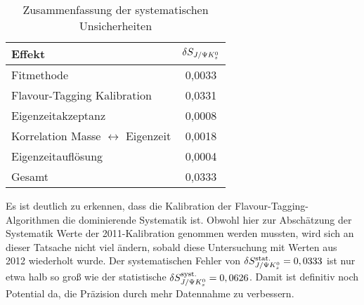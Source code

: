 \begin{table}[hptb]
\centering
\caption{Zusammenfassung der systematischen Unsicherheiten}
\label{tab:syst_gesamt}
\begin{tabular}{l c }
\hline \hline
Effekt & $\delta S_{J/\Psi K_s^0}$ \\ \hline
Fitmethode & 0,0033 \\
Flavour-Tagging Kalibration & 0,0331 \\
Eigenzeitakzeptanz & 0,0008 \\
Korrelation Masse $\leftrightarrow$ Eigenzeit & 0,0018 \\ 
Eigenzeitauflösung & 0,0004 \\ \hline 
Gesamt & 0,0333 \\ \hline \hline
\end{tabular}
\end{table}
Es ist deutlich zu erkennen, dass die Kalibration der Flavour-Tagging-Algorithmen die dominierende Systematik ist. Obwohl hier zur Abschätzung der Systematik Werte der 2011-Kalibration genommen werden mussten, wird sich an dieser Tatsache nicht viel ändern, sobald diese Untersuchung mit Werten aus 2012 wiederholt wurde. Der systematischen Fehler von $\delta S_{J/\Psi K_s^0}^{\text{stat.}}=0,0333$ ist nur etwa halb so groß wie der statistische $\delta S_{J/\Psi K_s^0}^{\text{syst.}}=0,0626$. Damit ist definitiv noch Potential da, die Präzision durch mehr Datennahme zu verbessern.